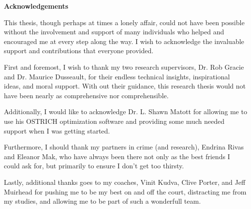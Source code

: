 \cleardoublepage


\begin{center}\textbf{Acknowledgements}\end{center}

This thesis, though perhaps at times a lonely affair, could not have been possible without the involvement and support of many individuals who helped and encouraged me at every step along the way. I wish to acknowledge the invaluable support and contributions that everyone provided. 

First and foremost, I wish to thank my two research supervisors, Dr. Rob Gracie and Dr. Maurice Dusseault, for their endless technical insights, inspirational ideas, and moral support. With out their guidance, this research thesis would not have been nearly as comprehensive nor comprehensible.

Additionally, I would like to acknowledge Dr. L. Shawn Matott for allowing me to use his OSTRICH optimization software and providing some much needed support when I was getting started. 

Furthermore, I should thank my partners in crime (and research), Endrina Rivas and Eleanor Mak, who have always been there not only as the best friends I could ask for, but primarily to ensure I don't get too thirsty.

Lastly, additional thanks goes to my coaches, Vinit Kudva, Clive Porter, and Jeff Muirhead for pushing me to be my best on and off the court, distracting me from my studies, and allowing me to be part of such a wonderfull team.

\cleardoublepage





\renewcommand\contentsname{Table of Contents}
\tableofcontents
\cleardoublepage
{}

\listoftables
\cleardoublepage
{}		%

